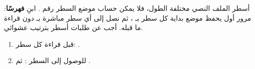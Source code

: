 \begin{statement}
أسطر الملف النصي مختلفة الطول، فلا يمكن حساب موضع السطر رقم . ابنِ \textbf{فهرسًا}: مرور أول يحفظ موضع بداية كل سطر بـ ، ثم نصل إلى أي سطر مباشرة بـ  دون قراءة ما قبله. أجب عن طلبات أسطر بترتيب عشوائي.
\end{statement}
\begin{stepsbox}\begin{enumerate}
\item قبل قراءة كل سطر: .
\item للوصول إلى السطر :  ثم .
\end{enumerate}\end{stepsbox}
